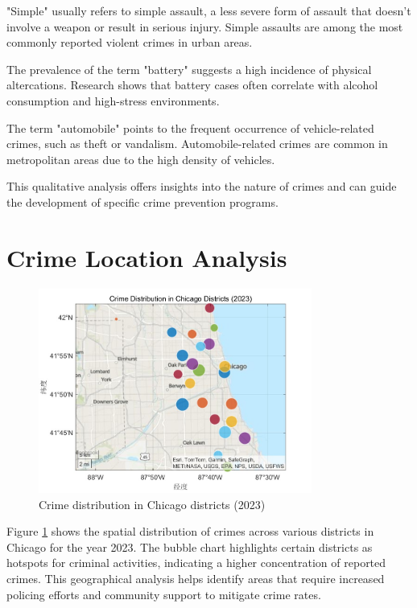 \documentclass{article}
\begin{document}
"Simple" usually refers to simple assault, a less severe form of assault that doesn't involve a weapon or result in serious injury. Simple assaults are among the most commonly reported violent crimes in urban areas.

The prevalence of the term "battery" suggests a high incidence of physical altercations. Research shows that battery cases often correlate with alcohol consumption and high-stress environments.

The term "automobile" points to the frequent occurrence of vehicle-related crimes, such as theft or vandalism. Automobile-related crimes are common in metropolitan areas due to the high density of vehicles.

This qualitative analysis offers insights into the nature of crimes and can guide the development of specific crime prevention programs.

\FloatBarrier

\section{Crime Location Analysis}

\begin{figure}[h!]
    \centering
    \includegraphics[width=0.8\textwidth]{Crime_distribution_bubble.jpg}
    \caption{Crime distribution in Chicago districts (2023)}
    \label{fig:crime_distribution}
\end{figure}

Figure \ref{fig:crime_distribution} shows the spatial distribution of crimes across various districts in Chicago for the year 2023. The bubble chart highlights certain districts as hotspots for criminal activities, indicating a higher concentration of reported crimes. This geographical analysis helps identify areas that require increased policing efforts and community support to mitigate crime rates.
\end{document}
